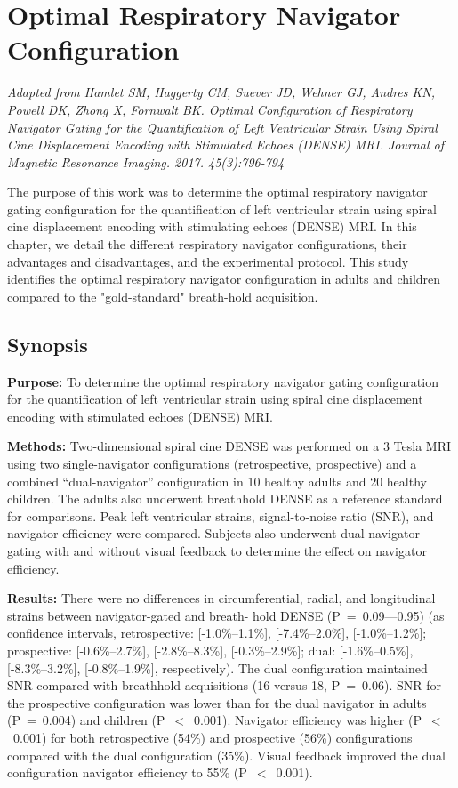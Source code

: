 \chapter{Optimal Respiratory Navigator Configuration}

\begin{center}
	\textit{Adapted from Hamlet SM, Haggerty CM, Suever JD, Wehner GJ, Andres KN, Powell DK, Zhong X, Fornwalt BK. Optimal Configuration of Respiratory Navigator Gating for the Quantification of Left Ventricular Strain Using Spiral Cine Displacement Encoding with Stimulated Echoes (DENSE) MRI. Journal of Magnetic Resonance Imaging. 2017. 45(3):796-794}
\end{center}

The purpose of this work was to determine the optimal respiratory navigator gating configuration for the quantification of left ventricular strain using spiral cine displacement encoding with stimulating echoes (DENSE) MRI.  In this chapter, we detail the different respiratory navigator configurations, their advantages and disadvantages, and the experimental protocol. This study identifies the optimal respiratory navigator configuration in adults and children compared to the "gold-standard" breath-hold acquisition.

\section{Synopsis}
	\noindent \textbf{Purpose:} To determine the optimal respiratory navigator gating configuration for the quantification of left ventricular strain using spiral cine displacement encoding with stimulated echoes (DENSE) MRI.
	
	\noindent \textbf{Methods:} Two-dimensional spiral cine DENSE was performed on a 3 Tesla MRI using two single-navigator configurations (retrospective, prospective) and a combined “dual-navigator” configuration in 10 healthy adults and 20 healthy children. The adults also underwent breathhold DENSE as a reference standard for comparisons. Peak left ventricular strains, signal-to-noise ratio (SNR), and navigator efficiency were compared. Subjects also underwent dual-navigator gating with and without visual feedback to determine the effect on navigator efficiency.
	
	\noindent \textbf{Results:} There were no differences in circumferential, radial, and longitudinal strains between navigator-gated and breath- hold DENSE (P~=~0.09---0.95) (as confidence intervals, retrospective: [-1.0\%--1.1\%], [-7.4\%--2.0\%], [-1.0\%$–$1.2\%]; prospective: [-0.6\%--2.7\%], [-2.8\%--8.3\%], [-0.3\%--2.9\%]; dual: [-1.6\%--0.5\%], [-8.3\%--3.2\%], [-0.8\%--1.9\%], respectively). The dual configuration maintained SNR compared with breathhold acquisitions (16 versus 18, P~=~0.06). SNR for the prospective configuration was lower than for the dual navigator in adults (P~=~0.004) and children (P~$<$~0.001). Navigator efficiency was higher (P~$<$~0.001) for both retrospective (54\%) and prospective (56\%) configurations compared with the dual configuration (35\%). Visual feedback improved the dual configuration navigator efficiency to 55\% (P~$<$~0.001).
	
